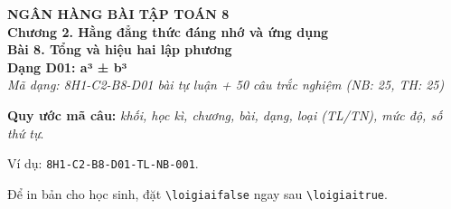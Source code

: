 \documentclass[12pt,a4paper]{article}
\newif\ifloigiai
\begin{document}
\begin{center}
{\Large\textbf{NGÂN HÀNG BÀI TẬP TOÁN 8}}\\[3pt]
\textbf{Chương 2. Hằng đẳng thức đáng nhớ và ứng dụng}\\[2pt]
\textbf{Bài 8. Tổng và hiệu hai lập phương}\\[2pt]
\textbf{Dạng D01: a³ ± b³}\\[2pt]
\textit{Mã dạng: 8H1-C2-B8-D01  bài tự luận + 50 câu trắc nghiệm \quad (NB: 25, TH: 25)}
\end{center}
\textbf{Quy ước mã câu:} \textit{khối, học kì, chương, bài, dạng, loại (TL/TN), mức độ, số thứ tự}.\par Ví dụ: \texttt{8H1-C2-B8-D01-TL-NB-001}.\par Để in bản cho học sinh, đặt \verb|\loigiaifalse| ngay sau \verb|\loigiaitrue|.
\end{document}

